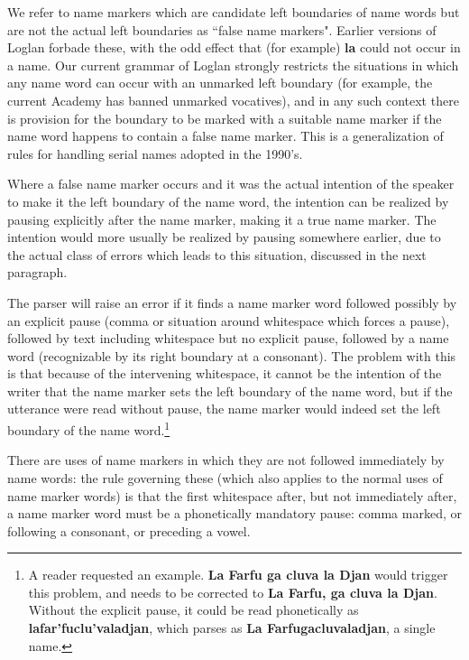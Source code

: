 \documentclass[12pt]{book}
\begin{document}
We refer to name markers which are candidate left boundaries of name words but are not the actual left boundaries as ``false name markers".  Earlier versions of Loglan forbade these, with the odd effect that (for example) {\bf la} could not occur in a name.  Our current grammar of Loglan strongly restricts the situations in which any name word can occur with an unmarked left boundary (for example, the current Academy has banned unmarked vocatives), and in any such context there is provision for the boundary to be marked with a suitable name marker if the name word happens to contain a false name marker.  This is a generalization of rules for handling serial names adopted in the 1990's.

Where a false name marker occurs and it was the actual intention of the speaker to make it the left boundary of the name word, the intention can be realized by pausing explicitly after the name marker, making it a true name marker.  The intention would more usually be realized by pausing somewhere earlier, due to the actual class of errors which leads to this situation, discussed in the next paragraph.

The parser will raise an error if it finds a name marker word followed possibly by an explicit pause (comma or situation around whitespace which forces a pause), followed by text including whitespace but no explicit pause, followed by a name word (recognizable by its right boundary at a consonant). The problem with this is that because of the intervening whitespace, it cannot be  the intention of the writer that the name marker sets the left boundary of the name word, but if the utterance were read without pause, the name marker would indeed set the left boundary of the name word.\footnote{A reader requested an example.  {\bf La Farfu ga cluva la Djan} would trigger this problem, and needs to be corrected to {\bf La Farfu, ga cluva la Djan}.  Without the explicit pause, it could be read phonetically as {\bf lafar'fuclu'valadjan}, which parses as {\bf La Farfugacluvaladjan}, a single name.}  

There are uses of name markers in which they are not followed immediately by name words:  the rule governing these (which also applies to the normal uses of name marker words) is that the first whitespace after, but not immediately after, a name marker word must be a phonetically mandatory pause: comma marked, or following a consonant, or preceding a vowel.
\end{document}
